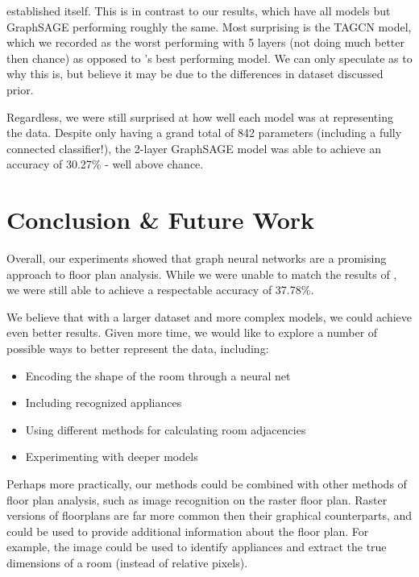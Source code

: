 \documentclass{article}
\begin{document}
established itself. This is in contrast to our results, which have all models but GraphSAGE performing roughly the same. Most surprising is the TAGCN model, which we recorded as the worst performing with 5 layers (not doing much better then chance) as opposed to \citet{floorgraphs2021}'s best performing model. We can only speculate as to why this is, but believe it may be due to the differences in dataset discussed prior.

Regardless, we were still surprised at how well each model was at representing the data. Despite only having a grand total of 842 parameters (including a fully connected classifier!), the 2-layer GraphSAGE model was able to achieve an accuracy of 30.27\% - well above chance.

\section{Conclusion \& Future Work}

Overall, our experiments showed that graph neural networks are a promising approach to floor plan analysis. While we were unable to match the results of \citet{floorgraphs2021}, we were still able to achieve a respectable accuracy of 37.78\%. 

We believe that with a larger dataset and more complex models, we could achieve even better results. Given more time, we would like to explore a number of possible ways to better represent the data, including:

\begin{itemize}
    \item Encoding the shape of the room through a neural net
    \item Including recognized appliances
    \item Using different methods for calculating room adjacencies
    \item Experimenting with deeper models
\end{itemize}

Perhaps more practically, our methods could be combined with other methods of floor plan analysis, such as image recognition on the raster floor plan. Raster versions of floorplans are far more common then their graphical counterparts, and could be used to provide additional information about the floor plan. For example, the image could be used to identify appliances and extract the true dimensions of a room (instead of relative pixels). 


\end{document}

